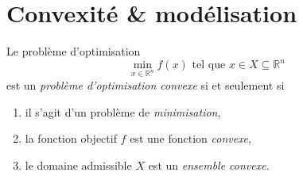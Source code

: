 \section{Convexité \& modélisation}

Le problème d'optimisation 
\[ 
\min_{x\in \mathbb{R}^n} f(x) \mbox{ tel que } x\in X\subseteq\mathbb{R}^n 
\]
est un \emph{problème d'optimisation convexe} si et seulement si
\begin{enumerate}
  \item il s'agit d'un problème de \emph{minimisation},
  \item la fonction objectif $f$ est une fonction \emph{convexe},
  \item le domaine admissible $X$ est un \emph{ensemble convexe}.
\end{enumerate}

\newpage

